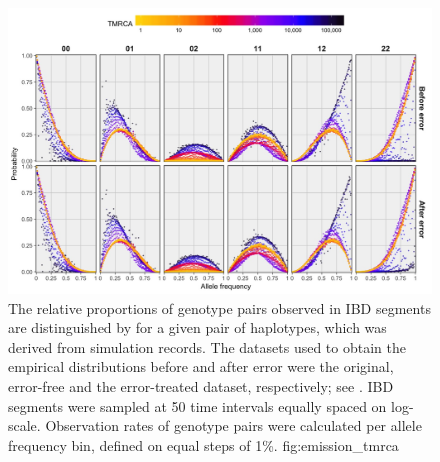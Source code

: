 

\begin{figure}[!htb]
\includegraphics[width=\textwidth]{./img/ch4/emission_tmrca_reduced_new}
{The relative proportions of genotype pairs observed in IBD segments are distinguished by  for a given pair of haplotypes, which was derived from simulation records.
The datasets used to obtain the empirical distributions before and after error were the original, error-free and the error-treated dataset, respectively; see .
IBD segments were sampled at 50 time intervals equally spaced on log-scale.
Observation rates of genotype pairs were calculated per allele frequency bin, defined on equal steps of 1\%.}
{fig:emission_tmrca}
\end{figure}
